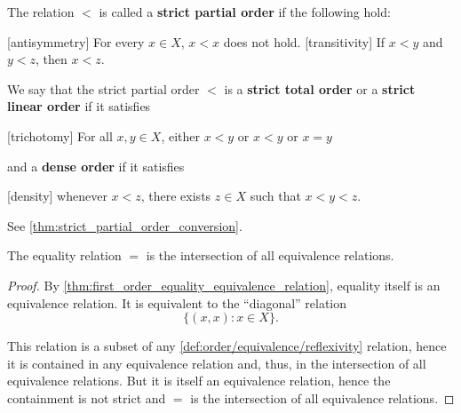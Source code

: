 \begin{definition}
\begin{defenum}
    \cite[168]{Enderton1977} The relation \( < \) is called a \textbf{strict partial order} if the following hold:
    \begin{description}
      [antisymmetry] For every \( x \in X \), \( x < x \) does not hold.
      [transitivity] If \( x < y \) and \( y < z \), then \( x < z \).
    \end{description}

    We say that the strict partial order \( < \) is a \textbf{strict total order} or a \textbf{strict linear order} if it satisfies
    \begin{description}
      [trichotomy] For all \( x, y \in X \), either \( x < y \) or \( x < y \) or \( x = y \)
    \end{description}
    and a \textbf{dense order} if it satisfies
    \begin{description}
      [density] whenever \( x < z \), there exists \( z \in X \) such that \( x < y < z \).
    \end{description}

    See \cref{thm:strict_partial_order_conversion}.
  \end{defenum}
\end{definition}

\begin{proposition}\label{thm:equality_is_smallest_equivalence_relation}
  The equality relation \( = \) is the intersection of all equivalence relations.
\end{proposition}
\begin{proof}
  By \cref{thm:first_order_equality_equivalence_relation}, equality itself is an equivalence relation. It is equivalent to the \enquote{diagonal} relation
  \begin{equation*}
    \{ (x, x) \colon x \in X \}.
  \end{equation*}

  This relation is a subset of any \ref{def:order/equivalence/reflexivity} relation, hence it is contained in any equivalence relation and, thus, in the intersection of all equivalence relations. But it is itself an equivalence relation, hence the containment is not strict and \( = \) is the intersection of all equivalence relations.
\end{proof}

